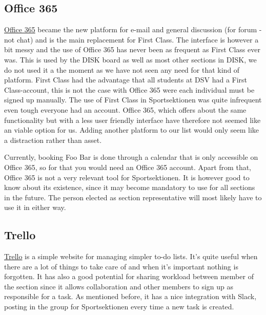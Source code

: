 \documentclass[12pt,a4paper]{article}
\begin{document}
		\subsection{Office 365}
			\href{http://portal.office.com}{Office 365} became the new platform for e-mail and general discussion (for forum - not chat) and is the main replacement for First Class. The interface is however a bit messy and the use of Office 365 has never been as frequent as First Class ever was. This is used by the DISK board as well as most other sections in DISK, we do not used it a the moment as we have not seen any need for that kind of platform. First Class had the advantage that all students at DSV had a First Class-account, this is not the case with Office 365 were each individual must be signed up manually. The use of First Class in Sportsektionen was quite infrequent even tough everyone had an account. Office 365, which offers about the same functionality but with a less user friendly interface have therefore not seemed like an viable option for us. Adding another platform to our list would only seem like a distraction rather than asset.

			Currently, booking Foo Bar is done through a calendar that is only accessible on Office 365, so for that you would need an Office 365 account. Apart from that, Office 365 is not a very relevant tool for Sportsektionen. It is however good to know about its existence, since it may become mandatory to use for all sections in the future. The person elected as section representative will most likely have to use it in either way.
		\subsection{Trello}
			\href{https://trello.com/b/ez76bD5J/sportsektionen}{Trello} is a simple website for managing simpler to-do lists. It's quite useful when there are a lot of things to take care of and when it's important nothing is forgotten. It has also a good potential for sharing workload between member of the section since it allows collaboration and other members to sign up as responsible for a task. As mentioned before, it has a nice integration with Slack, posting in the group for Sportsektionen every time a new task is created.
\end{document}
